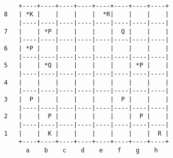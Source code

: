 \documentclass[10pt,a4paper,twoside]{report}
\begin{document}
  \begin{lstlisting}[basicstyle=\ttfamily\footnotesize]

        +----+----+----+----+----+----+----+----+
    8   | *K |    |    |    |  *R|    |    |    |
        |----|----|----|----|----|----|----|----|
    7   |    | *P |    |    |    |  Q |    |    |
        |----|----|----|----|----|----|----|----|
    6   | *P |    |    |    |    |    |    |    |
        |----|----|----|----|----|----|----|----|
    5   |    | *Q |    |    |    |    | *P |    |
        |----|----|----|----|----|----|----|----|
    4   |    |    |    |    |    |    |    |    |
        |----|----|----|----|----|----|----|----|
    3   |  P |    |    |    |    |  P |    |    |
        |----|----|----|----|----|----|----|----|
    2   |    |  P |    |    |    |    |  P |    |
        |----|----|----|----|----|----|----|----|
    1   |    |  K |    |    |    |    |    |  R |
        +----+----+----+----+----+----+----+----+
          a    b    c    d    e    f    g    h

  \end{lstlisting}
\end{document}
